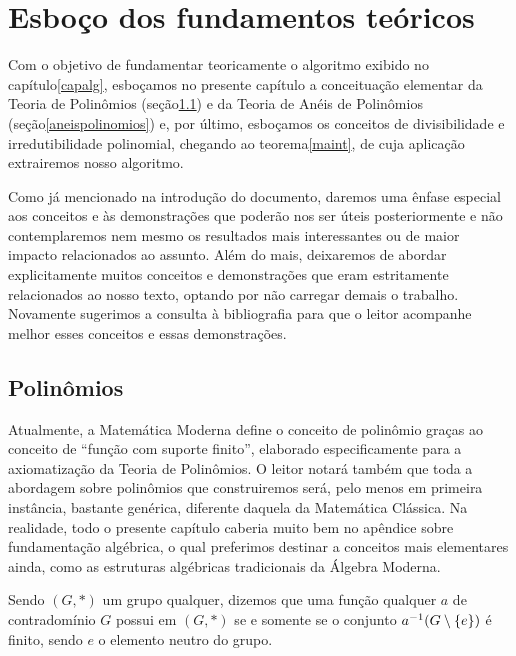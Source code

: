 
\chapter{Esboço dos fundamentos teóricos}\label{capfund}

Com o objetivo de fundamentar teoricamente o algoritmo exibido no
capítulo\xspace\ref{capalg}, esboçamos no presente capítulo a
conceituação elementar da Teoria de Polinômios
(seção\xspace\ref{polconceituacao}) e da Teoria de Anéis de Polinômios
  (seção\xspace\ref{aneispolinomios}) e, por último, esboçamos os
  conceitos de divisibilidade e irredutibilidade polinomial, chegando ao
  teorema\xspace\ref{maint}, de cuja aplicação extrairemos nosso
  algoritmo.

Como já mencionado na introdução do documento, daremos uma ênfase
especial aos conceitos e às demonstrações que poderão nos ser úteis
posteriormente e não contemplaremos nem mesmo os resultados mais
interessantes ou de maior impacto relacionados ao assunto. Além do mais,
deixaremos de abordar explicitamente
muitos conceitos e demonstrações
que eram estritamente relacionados ao nosso texto, optando por não
carregar demais o trabalho. Novamente sugerimos a consulta à
bibliografia para que o leitor acompanhe melhor esses conceitos e essas
demonstrações.

\section{Polinômios}\label{polconceituacao}

Atualmente, a Matemática Moderna define o conceito de polinômio graças
ao conceito de ``função com suporte finito'', elaborado especificamente
para a a\-xi\-o\-ma\-ti\-za\-ção da Teoria de Polinômios. O leitor
notará também que
toda a abordagem sobre polinômios que construiremos será, pelo menos em
primeira instância, bastante genérica, diferente daquela da Matemática
Clássica. Na realidade, todo o presente capítulo caberia muito bem no
apêndice sobre fundamentação algébrica, o qual preferimos destinar a
conceitos mais elementares ainda, como as estruturas algébricas
tradicionais da Álgebra Moderna.

\begin{Def}
  Sendo $(G,\ast)$ um grupo qualquer,
  dizemos que uma função qualquer $a$ de contradomínio $G$
  possui  em $(G,\ast)$ se e somente se o
  conjunto $a^{-1}(G\setminus \left\{ e \right\})$
  é finito, sendo $e$ o elemento neutro do grupo.
\end{Def}

